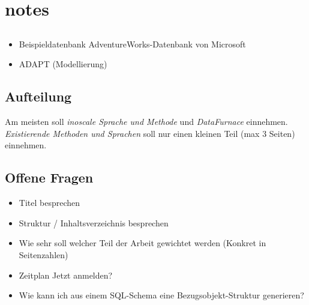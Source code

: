 \chapter{notes}
\section{}
\begin{itemize}
  \item Beispieldatenbank AdventureWorks-Datenbank von Microsoft
  \item ADAPT (Modellierung)
\end{itemize}

\section{Aufteilung}
Am meisten soll \textit{inoscale Sprache und Methode} und \textit{DataFurnace} einnehmen. \textit{Existierende Methoden und Sprachen} soll nur einen kleinen Teil (max 3 Seiten) einnehmen.


\section{Offene Fragen}
\begin{itemize}
  \item Titel besprechen
  \item Struktur / Inhaltsverzeichnis besprechen
  \item Wie sehr soll welcher Teil der Arbeit gewichtet werden (Konkret in Seitenzahlen)
  \item Zeitplan Jetzt anmelden?
  \item Wie kann ich aus einem SQL-Schema eine Bezugsobjekt-Struktur generieren?
\end{itemize}
